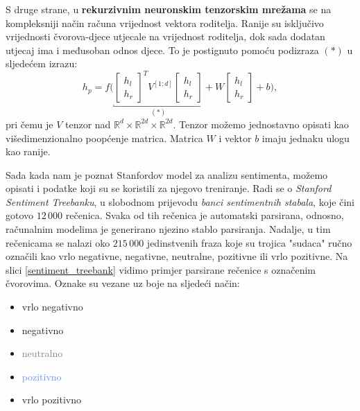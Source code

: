 \documentclass[a4paper,twoside,12pt]{memoir} %
\newcommand{\ti}[1]{\textit{#1\/}}
\newcommand{\tb}{\textbf}
\begin{document}
	S druge strane, u \tb{rekurzivnim neuronskim tenzorskim mrežama} se na kompleksniji način računa vrijednost vektora roditelja. Ranije su isključivo vrijednosti čvorova-djece utjecale na vrijednost roditelja, dok sada dodatan utjecaj ima i međusoban odnos djece. To je postignuto pomoću podizraza $(*)$ u sljedećem izrazu:
	\begin{equation*}
	h_p = f \bigg( \underbracket{
		{\begin{bmatrix}
			h_l \\
			h_r
			\end{bmatrix}}^T
		V^{[1:d]}
		\begin{bmatrix}
		h_l \\
		h_r
		\end{bmatrix}
	}_{(*)}
	\! {} + W
	\begin{bmatrix}
	h_l \\
	h_r
	\end{bmatrix}
	+ b
	\bigg),
	\end{equation*}
	pri čemu je $V$ tenzor nad $\mathbb{R}^d \times \mathbb{R}^{2d} \times \mathbb{R}^{2d}$. Tenzor možemo jednostavno opisati kao višedimenzionalno poopćenje matrica. Matrica $W$ i vektor $b$ imaju jednaku ulogu kao ranije.

	\bigskip

	Sada kada nam je poznat Stanfordov model za analizu sentimenta, možemo opisati i podatke koji su se koristili za njegovo treniranje. Radi se o \ti{Stanford Sentiment Treebanku}, u slobodnom prijevodu \ti{banci sentimentnih stabala}, koje čini gotovo $12\,000$ rečenica. Svaka od tih rečenica je automatski parsirana, odnosno, računalnim modelima je generirano njezino stablo parsiranja. Nadalje, u tim rečenicama se nalazi oko $215\,000$ jedinstvenih fraza koje su trojica "sudaca" ručno označili kao vrlo negativne, negativne, neutralne, pozitivne ili vrlo pozitivne. Na slici \ref{sentiment_treebank} vidimo primjer parsirane rečenice s označenim čvorovima. Oznake su vezane uz boje na sljedeći način:
	\begin{itemize}
		\item 	\textcolor{Mahogany}{vrlo negativno}
		\item 	\textcolor{Peach}{negativno}
		\item 	\textcolor{Gray}{neutralno}
		\item 	\textcolor{CornflowerBlue}{pozitivno}
		\item	\textcolor{NavyBlue}{vrlo pozitivno}
	\end{itemize}
\end{document}
